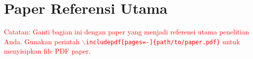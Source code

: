 \section{Paper Referensi Utama}

% 

\textcolor{red}{Catatan: Ganti bagian ini dengan paper yang menjadi referensi utama penelitian Anda. Gunakan perintah \texttt{$\backslash$includepdf[pages=-]\{path/to/paper.pdf\}} untuk menyisipkan file PDF paper.}
